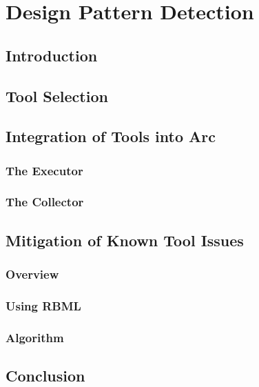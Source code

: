 \chapter{Design Pattern Detection}

\section{Introduction}

\section{Tool Selection}

\section{Integration of Tools into Arc}

\subsection{The Executor}

\subsection{The Collector}

\section{Mitigation of Known Tool Issues}

\subsection{Overview}

\subsection{Using RBML}

\subsection{Algorithm}

\section{Conclusion}